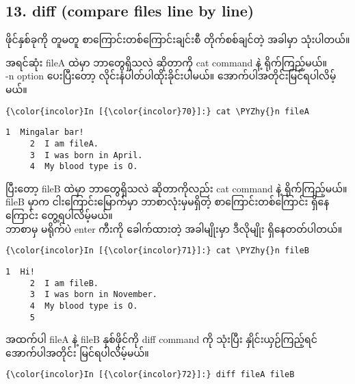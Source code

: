 \documentclass[11pt]{article}
\def\PYZhy{\char`\-}
\begin{document}
    \subsection{13. diff (compare files line by
line)}\label{diff-compare-files-line-by-line}

ဖိုင်နှစ်ခုကို တူမတူ စာကြောင်းတစ်ကြောင်းချင်းစီ တိုက်စစ်ချင်တဲ့ အခါမှာ
သုံးပါတယ်။

    အရင်ဆုံး fileA ထဲမှာ ဘာတွေရှိသလဲ ဆိုတာကို cat command နဲ့
ရိုက်ကြည့်မယ်။\\
-n option ပေးပြီးတော့ လိုင်းနံပါတ်ပါထိုးခိုင်းပါမယ်။
အောက်ပါအတိုင်းမြင်ရပါလိမ့်မယ်။

    \begin{Verbatim}[commandchars=\\\{\}]
{\color{incolor}In [{\color{incolor}70}]:} cat \PYZhy{}n fileA
\end{Verbatim}

    \begin{Verbatim}[commandchars=\\\{\}]
     1	Mingalar bar!
     2	I am fileA.
     3	I was born in April.
     4	My blood type is O.

    \end{Verbatim}

    ပြီးတော့ fileB ထဲမှာ ဘာတွေရှိသလဲ ဆိုတာကိုလည်း cat command နဲ့
ရိုက်ကြည့်မယ်။\\
fileB မှာက ငါးကြောင်းမြောက်မှာ ဘာစာလုံးမှမရှိတဲ့ စာကြောင်းတစ်ကြောင်း
ရှိနေကြောင်း တွေ့ရပါလိမ့်မယ်။\\
ဘာစာမှ မရိုက်ပဲ enter ကီးကို ခေါက်ထားတဲ့ အခါမျိုးမှာ ဒီလိုမျိုး
ရှိနေတတ်ပါတယ်။

    \begin{Verbatim}[commandchars=\\\{\}]
{\color{incolor}In [{\color{incolor}71}]:} cat \PYZhy{}n fileB
\end{Verbatim}

    \begin{Verbatim}[commandchars=\\\{\}]
     1	Hi!
     2	I am fileB.
     3	I was born in November.
     4	My blood type is O.
     5	

    \end{Verbatim}

    အထက်ပါ fileA နဲ့ fileB နှစ်ဖိုင်ကို diff command ကို သုံးပြီး
နှိုင်းယှဉ်ကြည့်ရင် အောက်ပါအတိုင်း မြင်ရပါလိမ့်မယ်။

    \begin{Verbatim}[commandchars=\\\{\}]
{\color{incolor}In [{\color{incolor}72}]:} diff fileA fileB
\end{Verbatim}
\end{document}

